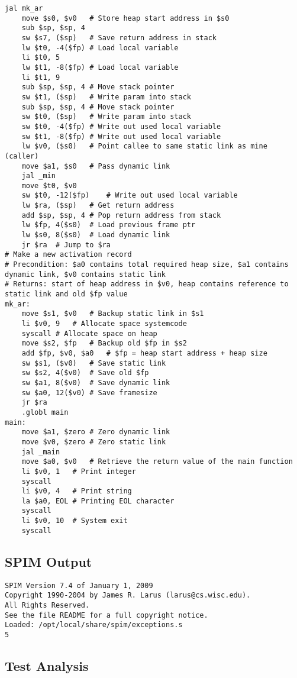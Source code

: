 \begin{lstlisting}[showstringspaces=false,breaklines=true,backgroundcolor=\color{light-gray}, captionpos=b]
	jal mk_ar
	move $s0, $v0	# Store heap start address in $s0
	sub $sp, $sp, 4
	sw $s7, ($sp)	# Save return address in stack
	lw $t0, -4($fp)	# Load local variable
	li $t0, 5
	lw $t1, -8($fp)	# Load local variable
	li $t1, 9
	sub $sp, $sp, 4	# Move stack pointer
	sw $t1, ($sp)	# Write param into stack
	sub $sp, $sp, 4	# Move stack pointer
	sw $t0, ($sp)	# Write param into stack
	sw $t0, -4($fp)	# Write out used local variable
	sw $t1, -8($fp)	# Write out used local variable
	lw $v0, ($s0)	# Point callee to same static link as mine (caller)
	move $a1, $s0	# Pass dynamic link
	jal _min
	move $t0, $v0
	sw $t0, -12($fp)	# Write out used local variable
	lw $ra, ($sp)	# Get return address
	add $sp, $sp, 4	# Pop return address from stack
	lw $fp, 4($s0)	# Load previous frame ptr
	lw $s0, 8($s0)	# Load dynamic link
	jr $ra	# Jump to $ra
# Make a new activation record
# Precondition: $a0 contains total required heap size, $a1 contains dynamic link, $v0 contains static link
# Returns: start of heap address in $v0, heap contains reference to static link and old $fp value
mk_ar:
	move $s1, $v0	# Backup static link in $s1
	li $v0, 9	# Allocate space systemcode
	syscall	# Allocate space on heap
	move $s2, $fp	# Backup old $fp in $s2
	add $fp, $v0, $a0	# $fp = heap start address + heap size
	sw $s1, ($v0)	# Save static link
	sw $s2, 4($v0)	# Save old $fp
	sw $a1, 8($v0)	# Save dynamic link
	sw $a0, 12($v0)	# Save framesize
	jr $ra
	.globl main
main:
	move $a1, $zero	# Zero dynamic link
	move $v0, $zero	# Zero static link
	jal _main
	move $a0, $v0	# Retrieve the return value of the main function
	li $v0, 1	# Print integer
	syscall
	li $v0, 4	# Print string
	la $a0, EOL	# Printing EOL character
	syscall
	li $v0, 10	# System exit
	syscall

\end{lstlisting}\subsection{SPIM Output}
\begin{verbatim}
SPIM Version 7.4 of January 1, 2009
Copyright 1990-2004 by James R. Larus (larus@cs.wisc.edu).
All Rights Reserved.
See the file README for a full copyright notice.
Loaded: /opt/local/share/spim/exceptions.s
5
\end{verbatim}\subsection{Test Analysis}

